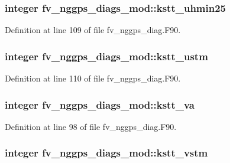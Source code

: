 \subsubsection[{kstt\-\_\-uhmin25}]{\setlength{\rightskip}{0pt plus 5cm}integer fv\-\_\-nggps\-\_\-diags\-\_\-mod\-::kstt\-\_\-uhmin25\hspace{0.3cm}{\ttfamily [private]}}\label{classfv__nggps__diags__mod_a73ee0ca4c35514c00e2da4dee53907e7}


Definition at line 109 of file fv\-\_\-nggps\-\_\-diag.\-F90.

\subsubsection[{kstt\-\_\-ustm}]{\setlength{\rightskip}{0pt plus 5cm}integer fv\-\_\-nggps\-\_\-diags\-\_\-mod\-::kstt\-\_\-ustm\hspace{0.3cm}{\ttfamily [private]}}\label{classfv__nggps__diags__mod_a4ead52177a3f64c0f0e25bd5b1a0f2d0}


Definition at line 110 of file fv\-\_\-nggps\-\_\-diag.\-F90.

\subsubsection[{kstt\-\_\-va}]{\setlength{\rightskip}{0pt plus 5cm}integer fv\-\_\-nggps\-\_\-diags\-\_\-mod\-::kstt\-\_\-va\hspace{0.3cm}{\ttfamily [private]}}\label{classfv__nggps__diags__mod_aea4c4320cbee76e02d3cd4d8d27d66e3}


Definition at line 98 of file fv\-\_\-nggps\-\_\-diag.\-F90.

\subsubsection[{kstt\-\_\-vstm}]{\setlength{\rightskip}{0pt plus 5cm}integer fv\-\_\-nggps\-\_\-diags\-\_\-mod\-::kstt\-\_\-vstm\hspace{0.3cm}{\ttfamily [private]}}\label{classfv__nggps__diags__mod_a4abdf8ebb7e177ea5bbe1c78b16d9b30}


